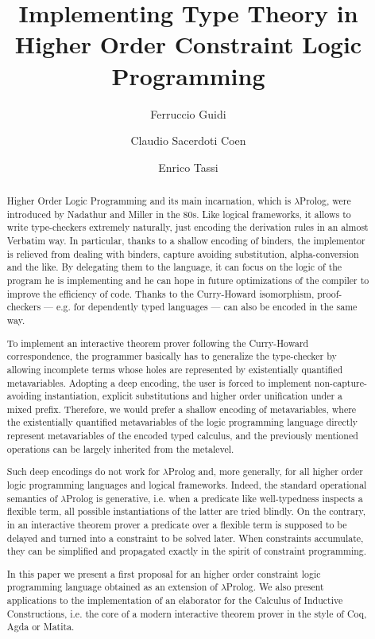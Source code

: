 \documentclass{easychair}
\title{Implementing Type Theory in Higher Order Constraint Logic Programming}
\author{Ferruccio Guidi \and Claudio Sacerdoti Coen \and Enrico Tassi}
\institute{
  Department of Computer Science and Engineering, University of Bologna \email{ferruccio.guidi@unibo.it} \and
  Department of Computer Scienc and Engineeringe, University of Bologna \email{claudio.sacerdoticoen@unibo.it} \and
  Inria Sophia-Antipolis, \email{Enrico.Tassi@inria.fr}}
\begin{document}
\maketitle

\begin{abstract}
Higher Order Logic Programming and its main incarnation, which is $\lambda$Prolog, were introduced by Nadathur and Miller in the 80s. Like logical frameworks, it allows to write type-checkers extremely naturally, just encoding the derivation rules in an almost Verbatim way. In particular, thanks to a shallow encoding of binders, the implementor is relieved from dealing with binders, capture avoiding substitution, alpha-conversion and the like. By delegating them to the language, it can focus on the logic of the program he is implementing and he can hope in future optimizations of the compiler to improve the efficiency of code. Thanks to the Curry-Howard isomorphism, proof-checkers --- e.g. for dependently typed languages --- can also be encoded in the same way.

To implement an interactive theorem prover following the Curry-Howard correspondence, the programmer basically has to generalize the type-checker by allowing incomplete terms whose holes are represented by existentially quantified metavariables. Adopting a deep encoding, the user is forced to implement non-capture-avoiding instantiation, explicit substitutions and higher order unification under a mixed prefix. Therefore, we would prefer a shallow encoding of metavariables, where the existentially quantified metavariables of the logic programming language directly represent metavariables of the encoded typed calculus, and the previously mentioned operations can be largely inherited from the metalevel.

Such deep encodings do not work for $\lambda$Prolog and, more generally, for all higher order logic programming languages and logical frameworks. Indeed, the standard operational semantics of $\lambda$Prolog is generative, i.e. when a predicate like well-typedness inspects a flexible term, all possible instantiations of the latter are tried blindly. On the contrary, in an interactive theorem prover a predicate over a flexible term is supposed to be delayed and turned into a constraint to be solved later. When constraints accumulate, they can be simplified and propagated exactly in the spirit of constraint programming.

In this paper we present a first proposal for an higher order constraint logic
programming language obtained as an extension of $\lambda$Prolog. We also present
applications to the implementation of an elaborator for the Calculus of
Inductive Constructions, i.e. the core of a modern interactive theorem prover
in the style of Coq, Agda or Matita.
\end{abstract}
\end{document}
